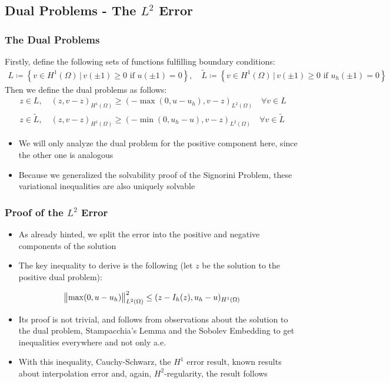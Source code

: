 \subsection{Dual Problems - The $L^2$ Error} 
\begin{frame}
	\frametitle{The Dual Problems}
	\vspace{1cm}
	\begin{definition}
		Firstly, define the following sets of functions fulfilling boundary conditions:
		\begin{align*}
			L \coloneqq \left\{ v \in H^1(\Omega) \,|\, v(\pm 1) \geq 0 \,\,\text{if}\,\, u(\pm 1) = 0 \right\} , \quad
			\tilde{L} \coloneqq \left\{ v \in H^1(\Omega) \,|\, v(\pm 1) \geq 0 \,\,\text{if}\,\, u_h(\pm 1) = 0 \right\}
		\end{align*} 
		Then we define the dual problems as follows:
		\begin{align} 
			z \in L,\quad (z,v-z)_{H^1(\Omega)} \geq (-\max(0,u-u_h),v-z)_{L^2(\Omega)} \quad \forall v \in L \label{eq:dual_variational_inequality} \\
			z \in \tilde{L},\quad (z,v-z)_{H^1(\Omega)} \geq (-\min(0,u_h-u),v-z)_{L^2(\Omega)} \quad \forall v \in \tilde{L}
		\end{align}
	\end{definition}
\vspace{-0.5cm}
\begin{itemize}
	\item We will only analyze the dual problem for the positive component here, since the other one is analogous
	\item Because we generalized the solvability proof of the Signorini Problem, these variational inequalities are also uniquely solvable 
\end{itemize}
\end{frame}

\begin{frame}
	\frametitle{Proof of the $L^2$ Error}
	\begin{itemize}
		\item As already hinted, we split the error into the positive and negative components of the solution
		\item The key inequality to derive is the following (let $z$ be the solution to the positive dual problem):
	\end{itemize}
\begin{equation}
			\norm{\max(0,u-u_h)}_{L^2(\Omega)}^2 \leq (z-I_h(z), u_h - u)_{H^1(\Omega)} \label{eq:scalar_producx_ineq_L2}
\end{equation}
\vspace{-1cm}
\begin{itemize}
	\item Its proof is not trivial, and follows from observations about the solution to the dual problem, Stampacchia's Lemma and the Sobolev Embedding to get inequalities everywhere and not only a.e.
	\item With this inequality, Cauchy-Schwarz, the $H^1$ error result, known results about interpolation error and, again, $H^2$-regularity, the result follows
\end{itemize}
\end{frame}

